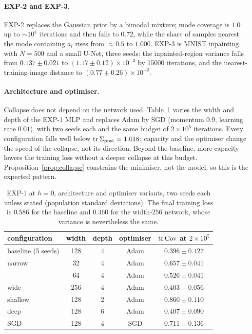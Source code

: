 \documentclass{article} %
\theoremstyle{plain}
\theoremstyle{definition}
\theoremstyle{remark}
\begin{document}
\paragraph{EXP-2 and EXP-3.} EXP-2 replaces the Gaussian prior by a bimodal mixture; mode
coverage is $1.0$ up to $\sim\!10^4$ iterations and then falls to $0.72$, while the share of samples
nearest the mode containing $a_i$ rises from $\approx0.5$ to $1.000$. EXP-3 is MNIST inpainting with
$N=500$ and a small U-Net, three seeds: the inpainted-region variance falls from
$0.137\pm0.021$ to $(1.17\pm0.12)\times10^{-3}$ by 15000 iterations, and the nearest-training-image
distance to $(0.77\pm0.26)\times10^{-3}$.

\paragraph{Architecture and optimiser.} Collapse does not depend on the network used.
Table~\ref{tab:ablation} varies the width and depth of the EXP-1 MLP and replaces Adam by SGD
(momentum $0.9$, learning rate $0.01$), with two seeds each and the same budget of $2\times10^5$
iterations. Every configuration falls well below $\operatorname{tr}\Sigma_{\mathrm{post}}=1.018$; capacity and the
optimiser change the speed of the collapse, not its direction. Beyond the baseline, more capacity
lowers the training loss without a deeper collapse at this budget. Proposition~\ref{prop:collapse}
constrains the minimiser, not the model, so this is the expected pattern.

\begin{table}[htb]
\centering\small
\begin{tabular}{lcccc}
\toprule
configuration & width & depth & optimiser & $\operatorname{tr}\operatorname{Cov}$ at $2\times10^5$ \\
\midrule
baseline (5 seeds) & 128 & 4 & Adam & $0.396\pm0.127$\\
narrow & 32 & 4 & Adam & $0.657\pm0.041$\\
 & 64 & 4 & Adam & $0.526\pm0.041$\\
wide & 256 & 4 & Adam & $0.403\pm0.056$\\
shallow & 128 & 2 & Adam & $0.860\pm0.110$\\
deep & 128 & 6 & Adam & $0.407\pm0.090$\\
SGD & 128 & 4 & SGD & $0.711\pm0.136$\\
\bottomrule
\end{tabular}
\caption{EXP-1 at $h=0$, architecture and optimiser variants, two seeds each unless stated
(population standard deviations). The final training loss is $0.586$ for the baseline and $0.460$
for the width-$256$ network, whose variance is nevertheless the same.}
\label{tab:ablation}
\end{table}
\end{document}
